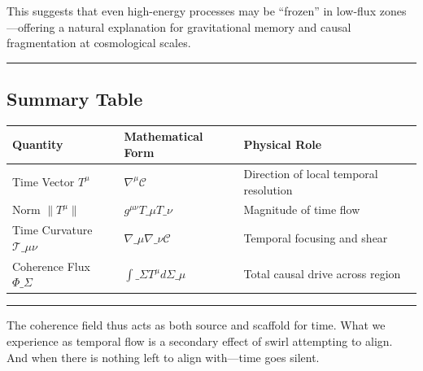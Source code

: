 \documentclass[
  11pt,
]{article}
\begin{document}
This suggests that even high-energy processes may be ``frozen'' in
low-flux zones---offering a natural explanation for gravitational memory
and causal fragmentation at cosmological scales.

\begin{center}\rule{0.5\linewidth}{0.5pt}\end{center}

\subsection{Summary Table}\label{summary-table}

\begin{longtable}[]{@{}
  >{\raggedright\arraybackslash}p{}
  >{\raggedright\arraybackslash}p{}
  >{\raggedright\arraybackslash}p{}@{}}
\toprule\noalign{}
\begin{minipage}[b]{\linewidth}\raggedright
Quantity
\end{minipage} & \begin{minipage}[b]{\linewidth}\raggedright
Mathematical Form
\end{minipage} & \begin{minipage}[b]{\linewidth}\raggedright
Physical Role
\end{minipage} \\
\midrule\noalign{}
\endhead
\bottomrule\noalign{}
\endlastfoot
Time Vector \(T^\mu\) & \(\nabla^\mu \mathcal{C}\) & Direction of local
temporal resolution \\
Norm \(\|T^\mu\|\) & \(g^{\mu\nu} T\_\mu T\_\nu\) & Magnitude of time
flow \\
Time Curvature \(\mathcal{T}\_{\mu\nu}\) &
\(\nabla\_\mu \nabla\_\nu \mathcal{C}\) & Temporal focusing and shear \\
Coherence Flux \(\Phi\_\Sigma\) & \(\int\_\Sigma T^\mu d\Sigma\_\mu\) &
Total causal drive across region \\
\end{longtable}

\begin{center}\rule{0.5\linewidth}{0.5pt}\end{center}

The coherence field thus acts as both source and scaffold for time. What
we experience as temporal flow is a secondary effect of swirl attempting
to align. And when there is nothing left to align with---time goes
silent.
\end{document}
